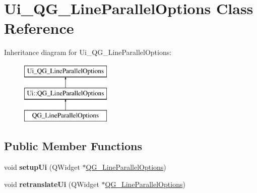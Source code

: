 \hypertarget{classUi__QG__LineParallelOptions}{\section{Ui\-\_\-\-Q\-G\-\_\-\-Line\-Parallel\-Options Class Reference}
\label{classUi__QG__LineParallelOptions}
}
Inheritance diagram for Ui\-\_\-\-Q\-G\-\_\-\-Line\-Parallel\-Options\-:\begin{figure}[H]
\begin{center}
\leavevmode
\includegraphics[height=3.000000cm]{classUi__QG__LineParallelOptions}
\end{center}
\end{figure}
\subsection*{Public Member Functions}
\begin{DoxyCompactItemize}
\item 
\hypertarget{classUi__QG__LineParallelOptions_a2f053913d9fe9b4d8f31206dd194d6ba}{void {\bfseries setup\-Ui} (Q\-Widget $\ast$\hyperlink{classQG__LineParallelOptions}{Q\-G\-\_\-\-Line\-Parallel\-Options})}\label{classUi__QG__LineParallelOptions_a2f053913d9fe9b4d8f31206dd194d6ba}

\item 
\hypertarget{classUi__QG__LineParallelOptions_ad6a4a2485f5d72e0e70d79e97de56bd9}{void {\bfseries retranslate\-Ui} (Q\-Widget $\ast$\hyperlink{classQG__LineParallelOptions}{Q\-G\-\_\-\-Line\-Parallel\-Options})}\label{classUi__QG__LineParallelOptions_ad6a4a2485f5d72e0e70d79e97de56bd9}

\end{DoxyCompactItemize}
